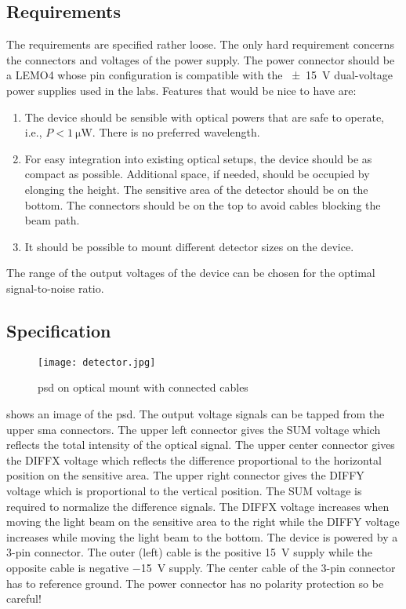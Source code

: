 \subsection{Requirements}

The requirements are specified rather loose. The only hard requirement concerns the connectors and voltages of the power supply. The power connector should be a LEMO4 whose pin configuration is compatible with the \SI{\pm15}{\volt} dual-voltage power supplies used in the labs. Features that would be nice to have are:
\begin{enumerate}
	\item The device should be sensible with optical powers that are safe to operate, i.e., $P<\SI{1}{\micro\watt}$. There is no preferred wavelength.
	\item For easy integration into existing optical setups, the device should be as compact as possible. Additional space, if needed, should be occupied by elonging the height. The sensitive area of the detector should be on the bottom. The connectors should be on the top to avoid cables blocking the beam path.
	\item It should be possible to mount different detector sizes on the device.
\end{enumerate}
The range of the output voltages of the device can be chosen for the optimal signal-to-noise ratio.

\subsection{Specification}

\begin{figure}[H]
	\centering
	\texttt{[image: detector.jpg]}
	\caption{\gls{psd} on optical mount with connected cables}\label{fig:detector}
\end{figure}
 shows an image of the \gls{psd}.
The output voltage signals can be tapped from the upper \gls{sma} connectors.
The upper left connector gives the SUM voltage which reflects the total intensity of the optical signal.
The upper center connector gives the DIFFX voltage which reflects the difference proportional to the horizontal position on the sensitive area.
The upper right connector gives the DIFFY voltage which is proportional to the vertical position.
The SUM voltage is required to normalize the difference signals.
The DIFFX voltage increases when moving the light beam on the sensitive area to the right while the DIFFY voltage increases while moving the light beam to the bottom.
The device is powered by a 3-pin connector.
The outer (left) cable is the positive \SI{+15}{\volt} supply while the opposite cable is negative \SI{-15}{\volt} supply.
The center cable of the 3-pin connector has to reference ground.
The power connector has no polarity protection so be careful!

